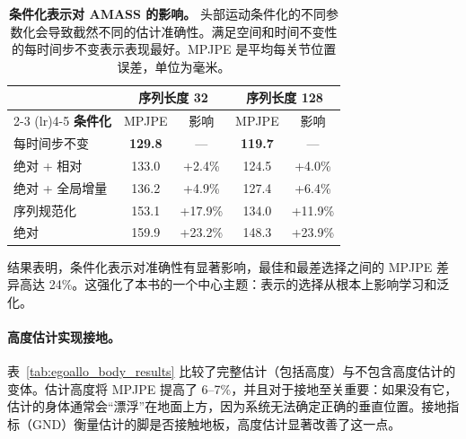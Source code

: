 \documentclass[../../book-main_zh.tex]{subfiles}
\begin{document}
\begin{table}[t]
    \centering
    \caption{\textbf{条件化表示对 AMASS 的影响。}
        头部运动条件化的不同参数化会导致截然不同的估计准确性。满足空间和时间不变性的每时间步不变表示表现最好。MPJPE 是平均每关节位置误差，单位为毫米。}
    \label{tab:egoallo_cond_ablation}
    \small
    \begin{tabular}{lcccc}
        \toprule
        & \multicolumn{2}{c}{\textbf{序列长度 32}} &
        \multicolumn{2}{c}{\textbf{序列长度 128}} \\
        \cmidrule(lr){2-3} \cmidrule(lr){4-5}
        \textbf{条件化} & MPJPE & 影响 & MPJPE & 影响 \\
        \midrule
        每时间步不变 & \textbf{129.8} & --- & \textbf{119.7} & --- \\
        绝对 + 相对 & 133.0 & +2.4\% & 124.5 & +4.0\% \\
        绝对 + 全局增量 & 136.2 & +4.9\% & 127.4 & +6.4\% \\
        序列规范化 & 153.1 & +17.9\% & 134.0 & +11.9\% \\
        绝对 & 159.9 & +23.2\% & 148.3 & +23.9\% \\
        \bottomrule
    \end{tabular}
\end{table}

结果表明，条件化表示对准确性有显著影响，最佳和最差选择之间的 MPJPE 差异高达 24\%。这强化了本书的一个中心主题：表示的选择从根本上影响学习和泛化。

\paragraph{高度估计实现接地。}
表~\ref{tab:egoallo_body_results} 比较了完整估计（包括高度）与不包含高度估计的变体。估计高度将 MPJPE 提高了 6--7\%，并且对于接地至关重要：如果没有它，估计的身体通常会“漂浮”在地面上方，因为系统无法确定正确的垂直位置。接地指标（GND）衡量估计的脚是否接触地板，高度估计显著改善了这一点。
\end{document}
